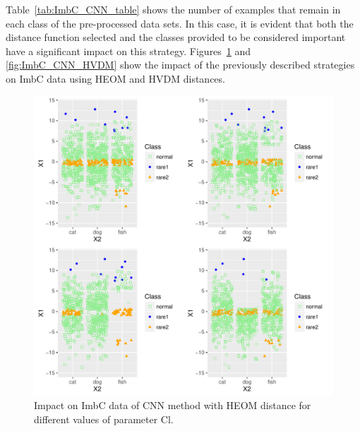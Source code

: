 \documentclass[10pt,a4paper]{article}\usepackage[]{graphicx}\usepackage[]{color}
\makeatletter
\def\maxwidth{ %
  \ifdim\Gin@nat@width>\linewidth
    \linewidth
  \else
    \Gin@nat@width
  \fi
}
\newenvironment{knitrout}{}{} %
\makeatother
\begin{document}
Table~\ref{tab:ImbC_CNN_table} shows the number of examples that remain in each class of the pre-processed data sets. In this case, it is evident that both the distance function selected and the classes provided to be considered important have a significant impact on this strategy. 
Figures~\ref{fig:ImbC_CNN_HEOM} and \ref{fig:ImbC_CNN_HVDM} show the impact of the previously described strategies on ImbC data using HEOM and HVDM distances.

\begin{knitrout}\footnotesize
{}\color{fgcolor}\begin{figure}

{\centering \includegraphics[width=\maxwidth]{figures/UBL-ImbC_CNN_HEOM-1} 

}

\caption[Impact on ImbC data of CNN method with HEOM distance for different values of parameter Cl]{Impact on ImbC data of CNN method with HEOM distance for different values of parameter Cl.}\label{fig:ImbC_CNN_HEOM}
\end{figure}


\end{knitrout}
\end{document}
